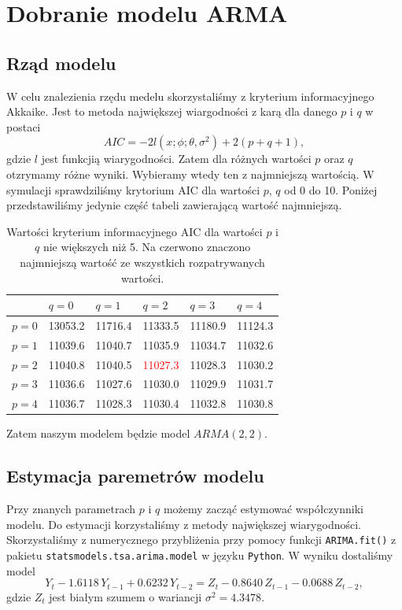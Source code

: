 \documentclass[12pt]{article}
\begin{document}
	\vspace{-3mm}\section{Dobranie modelu ARMA}
	\vspace{-3mm}\subsection{Rząd modelu}
	W celu znalezienia rzędu medelu skorzystaliśmy z kryterium informacyjnego Akkaike. Jest to metoda największej wiargodności z karą dla danego $p$ i $q$ w postaci
	\begin{equation}
		AIC=-2l(x;\phi;\theta,\sigma^2)+2(p+q+1),
	\end{equation}
	gdzie $l$ jest funkcjią wiarygodności. Zatem dla różnych wartości $p$ oraz $q$ otzrymamy różne wyniki. Wybieramy wtedy ten z najmniejszą wartością. W symulacji sprawdziliśmy krytorium AIC dla wartości $p$, $q$ od 0 do 10. Poniżej przedstawiliśmy jedynie część tabeli zawierającą wartość najmniejszą.
	\begin{table}[H]
		\centering
		\begin{tabularx}{4\textwidth/5}{|Y|Y|Y|Y|Y|Y|}
			\hline
			& $q=0$ & $q=1$ & $q=2$ & $q=3$ & $q=4$ \\\hline
			$p=0$ & 13053.2 & 11716.4 & 11333.5 & 11180.9 & 11124.3 \\\hline
			$p=1$ & 11039.6 & 11040.7 & 11035.9 & 11034.7 & 11032.6 \\\hline
			$p=2$ & 11040.8 & 11040.5 & \textcolor{red}{11027.3} & 11028.3 & 11030.2 \\\hline
			$p=3$ & 11036.6 & 11027.6 & 11030.0 & 11029.9 & 11031.7 \\\hline
			$p=4$ & 11036.7 & 11028.3 & 11030.4 & 11032.8 & 11030.8 \\\hline
		\end{tabularx}\caption{Wartości kryterium informacyjnego AIC dla wartości $p$ i $q$ nie większych niż 5. Na czerwono znaczono najmniejszą wartość ze wszystkich rozpatrywanych wartości.}
	\end{table}
\noindent Zatem naszym modelem będzie model $ARMA(2,2)$.
	\vspace{-3mm}\subsection{Estymacja paremetrów modelu}
	Przy znanych parametrach $p$ i $q$ możemy zacząć estymować współczynniki modelu. Do estymacji korzystaliśmy z metody największej wiarygodności. Skorzystaliśmy z numerycznego przybliżenia przy pomocy funkcji \verb*|ARIMA.fit()| z pakietu \verb*|statsmodels.tsa.arima.model| w języku \verb*|Python|. W wyniku dostaliśmy model
	\begin{equation}\label{model}
		Y_t-1.6118\,Y_{t-1}+0.6232\,Y_{t-2}=Z_t-0.8640\,Z_{t-1}-0.0688\,Z_{t-2},
	\end{equation}
     gdzie $Z_t$ jest białym szumem o wariancji $\sigma^2=4.3478$.
	
\end{document}
